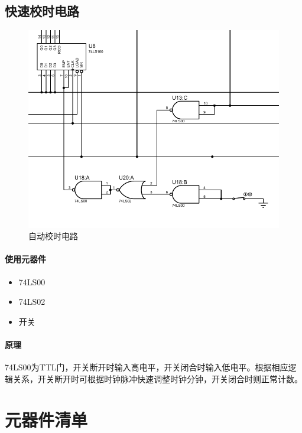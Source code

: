 \documentclass[lang=cn, 11pt, a4paper, cite=authornum, ctexfont]{paper}
\begin{document}
\subsection{快速校时电路}

\begin{figure}[H]
	\begin{center}
		\includegraphics[width=1\textwidth]{pdf/自动校时电路.PDF}
		\caption{自动校时电路\label{ifg:config}}
	\end{center}
\end{figure}

\paragraph{使用元器件}

\begin{itemize}
	\item 74LS00
	\item 74LS02
	\item 开关
\end{itemize}

\paragraph{原理}

74LS00为TTL门，开关断开时输入高电平，开关闭合时输入低电平。根据相应逻辑关系，开关断开时可根据时钟脉冲快速调整时钟分钟，开关闭合时则正常计数。

\section{元器件清单}
\end{document}
